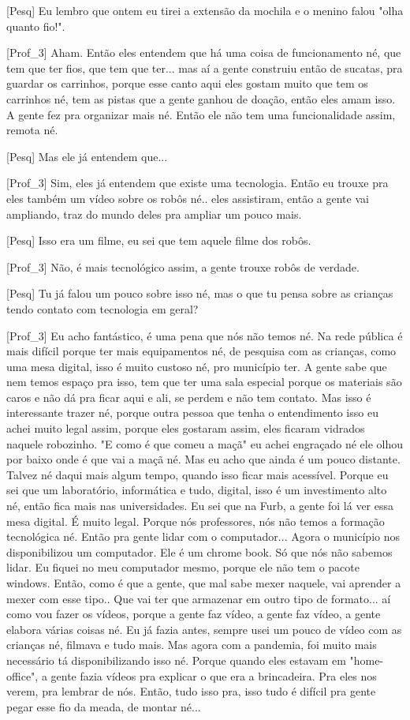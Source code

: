 [Pesq] Eu lembro que ontem eu tirei a extensão da mochila e o menino falou "olha quanto fio!".

[Prof\_3] Aham. Então eles entendem que há uma coisa de funcionamento né, que tem que ter fios, que tem que ter... mas aí a gente construiu então de sucatas, pra guardar os carrinhos, porque esse canto aqui eles gostam muito que tem os carrinhos né, tem as pistas que a gente ganhou de doação, então eles amam isso. A gente fez pra organizar mais né. Então ele não tem uma funcionalidade assim, remota né.

[Pesq] Mas ele já entendem que...

[Prof\_3] Sim, eles já entendem que existe uma tecnologia. Então eu trouxe pra eles também um vídeo sobre os robôs né.. eles assistiram, então a gente vai ampliando, traz do mundo deles pra ampliar um pouco mais.

[Pesq] Isso era um filme, eu sei que tem aquele filme dos robôs.

[Prof\_3] Não, é mais tecnológico assim, a gente trouxe robôs de verdade.

[Pesq] Tu já falou um pouco sobre isso né, mas o que tu pensa sobre as crianças tendo contato com tecnologia em geral?

[Prof\_3] Eu acho fantástico, é uma pena que nós não temos né. Na rede pública é mais difícil porque ter mais equipamentos né, de pesquisa com as crianças, como uma mesa digital, isso é muito custoso né, pro município ter. A gente sabe que nem temos espaço pra isso, tem que ter uma sala especial porque os materiais são caros e não dá pra ficar aqui e ali, se perdem e não tem contato. Mas isso é interessante trazer né, porque outra pessoa que tenha o entendimento isso eu achei muito legal assim, porque eles gostaram assim, eles ficaram vidrados naquele robozinho. "E como é que comeu a maçã" eu achei engraçado né ele olhou por baixo onde é que vai a maçã né. Mas eu acho que ainda é um pouco distante. Talvez né daqui mais algum tempo, quando isso ficar mais acessível. Porque eu sei que um laboratório, informática e tudo, digital, isso é um investimento alto né, então fica mais nas universidades. Eu sei que na Furb, a gente foi lá ver essa mesa digital. É muito legal. Porque nós professores, nós não temos a formação tecnológica né. Então pra gente lidar com o computador... Agora o município nos disponibilizou um computador. Ele é um chrome book. Só que nós não sabemos lidar. Eu fiquei no meu computador mesmo, porque ele não tem o pacote windows. Então, como é que a gente, que mal sabe mexer naquele, vai aprender a mexer com esse tipo.. Que vai ter que armazenar em outro tipo de formato... aí como vou fazer os vídeos, porque a gente faz vídeo, a gente faz vídeo, a gente elabora várias coisas né. Eu já fazia antes, sempre usei um pouco de vídeo com as crianças né, filmava e tudo mais. Mas agora com a pandemia, foi muito mais necessário tá disponibilizando isso né. Porque quando eles estavam em "home-office", a gente fazia vídeos pra explicar o que era a brincadeira. Pra eles nos verem, pra lembrar de nós. Então, tudo isso pra, isso tudo é difícil pra gente pegar esse fio da meada, de montar né...

